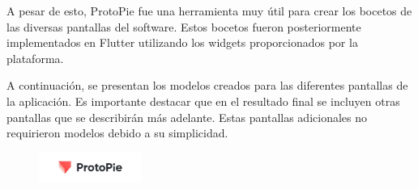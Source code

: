 \documentclass{article}
\begin{document}
A pesar de esto, ProtoPie fue una herramienta muy útil para crear los bocetos de las diversas pantallas del software. Estos bocetos fueron posteriormente implementados en Flutter utilizando los widgets proporcionados por la plataforma.

A continuación, se presentan los modelos creados para las diferentes pantallas de la aplicación. Es importante destacar que en el resultado final se incluyen otras pantallas que se describirán más adelante. Estas pantallas adicionales no requirieron modelos debido a su simplicidad.

\begin{figure}[h]
    \centering
    \includegraphics[width=0.3\textwidth]{imagenes/logos/logo_protopie.png}
\end{figure}
\end{document}
